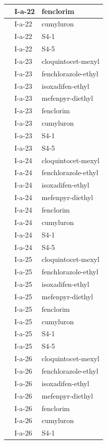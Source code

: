 \documentclass[11pt,a4paper]{article}
\begin{document}
\begin{table}[h]
\begin{tabular}{|l|l|l|}
 & I-a-22 & fenclorim \\ \hline
 & I-a-22 & cumyluron \\ \hline
 & I-a-22 & S4-1 \\ \hline
 & I-a-22 & S4-5 \\ \hline
 & I-a-23 & cloquintocet-mexyl \\ \hline
 & I-a-23 & fenchlorazole-ethyl \\ \hline
 & I-a-23 & isoxadifen-ethyl \\ \hline
 & I-a-23 & mefenpyr-diethyl \\ \hline
 & I-a-23 & fenclorim \\ \hline
 & I-a-23 & cumyluron \\ \hline
 & I-a-23 & S4-1 \\ \hline
 & I-a-23 & S4-5 \\ \hline
 & I-a-24 & cloquintocet-mexyl \\ \hline
 & I-a-24 & fenchlorazole-ethyl \\ \hline
 & I-a-24 & isoxadifen-ethyl \\ \hline
 & I-a-24 & mefenpyr-diethyl \\ \hline
 & I-a-24 & fenclorim \\ \hline
 & I-a-24 & cumyluron \\ \hline
 & I-a-24 & S4-1 \\ \hline
 & I-a-24 & S4-5 \\ \hline
 & I-a-25 & cloquintocet-mexyl \\ \hline
 & I-a-25 & fenchlorazole-ethyl \\ \hline
 & I-a-25 & isoxadifen-ethyl \\ \hline
 & I-a-25 & mefenpyr-diethyl \\ \hline
 & I-a-25 & fenclorim \\ \hline
 & I-a-25 & cumyluron \\ \hline
 & I-a-25 & S4-1 \\ \hline
 & I-a-25 & S4-5 \\ \hline
 & I-a-26 & cloquintocet-mexyl \\ \hline
 & I-a-26 & fenchlorazole-ethyl \\ \hline
 & I-a-26 & isoxadifen-ethyl \\ \hline
 & I-a-26 & mefenpyr-diethyl \\ \hline
 & I-a-26 & fenclorim \\ \hline
 & I-a-26 & cumyluron \\ \hline
 & I-a-26 & S4-1 \\ \hline

\end{tabular}
\end{table}
\end{document}
